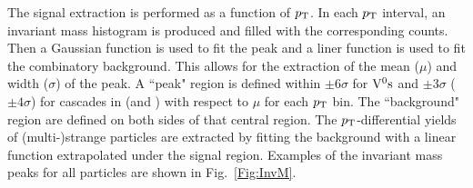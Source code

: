 The signal extraction is performed as a function of $p_{\rm T}$. In each $p_{\rm T}$ interval, an invariant mass histogram is produced and filled with the corresponding counts. Then a Gaussian function is used to fit the peak and a liner function is used to fit the combinatory background. This allows for the extraction of the mean ($\mu$) and width ($\sigma$) of the peak. A ``peak" region is defined within $\pm6 \sigma$ for ${\rm V}^{0}{\rm s}$ and $\pm3 \sigma$ ($\pm4 \sigma$) for cascades in \pp (and \pPb) with respect to $\mu$ for each $p_{\rm T}$ bin. The ``background" region are defined on both sides of that central region. The $p_{\rm T}$-differential yields of (multi-)strange particles are extracted by fitting the background with a linear function extrapolated under the signal region. Examples of the invariant mass peaks for all particles are shown in Fig.~\ref{Fig:InvM}. 
